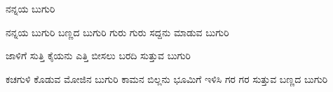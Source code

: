 \documentclass[main.tex]{subfiles}
\begin{document}
{\Huge {ನನ್ನಯ ಬುಗುರಿ}
\large
\begin{poem}
  \raggedleft
  \begin{stanza}
   ನನ್ನಯ ಬುಗುರಿ ಬಣ್ಣದ ಬುಗುರಿ \verseline
   ಗುರು ಗುರು ಸದ್ದನು ಮಾಡುವ ಬುಗುರಿ
  \end{stanza}
  \begin{stanza}
   ಜಾಳಿಗೆ ಸುತ್ತಿ ಕೈಯನು ಎತ್ತಿ \verseline
   ಬೀಸಲು ಬರದಿ ಸುತ್ತುವ ಬುಗುರಿ
  \end{stanza}
  \begin{stanza}
   ಕಚಗುಳಿ ಕೊಡುವ ಮೋಜಿನ ಬುಗುರಿ \verseline
   ಕಾಮನ ಬಿಲ್ಲನು ಭೂಮಿಗೆ ಇಳಿಸಿ \verseline
   ಗರ ಗರ ಸುತ್ತುವ ಬಣ್ಣದ ಬುಗುರಿ
  \end{stanza}
\end{poem}
\raggedleft

}
\end{document}
